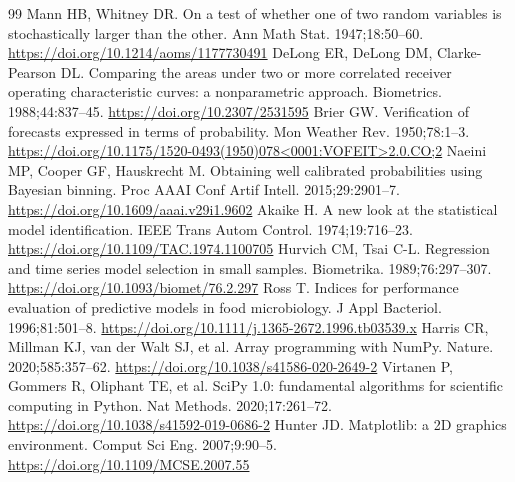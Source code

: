 {\begin{thebibliography}{99}
 Mann HB, Whitney DR. On a test of whether one of two random variables is stochastically larger than the other. Ann Math Stat. 1947;18:50--60. \url{https://doi.org/10.1214/aoms/1177730491}
 DeLong ER, DeLong DM, Clarke-Pearson DL. Comparing the areas under two or more correlated receiver operating characteristic curves: a nonparametric approach. Biometrics. 1988;44:837--45. \url{https://doi.org/10.2307/2531595}
 Brier GW. Verification of forecasts expressed in terms of probability. Mon Weather Rev. 1950;78:1--3. \url{https://doi.org/10.1175/1520-0493(1950)078<0001:VOFEIT>2.0.CO;2}
 Naeini MP, Cooper GF, Hauskrecht M. Obtaining well calibrated probabilities using Bayesian binning. Proc AAAI Conf Artif Intell. 2015;29:2901--7. \url{https://doi.org/10.1609/aaai.v29i1.9602}
 Akaike H. A new look at the statistical model identification. IEEE Trans Autom Control. 1974;19:716--23. \url{https://doi.org/10.1109/TAC.1974.1100705}
 Hurvich CM, Tsai C-L. Regression and time series model selection in small samples. Biometrika. 1989;76:297--307. \url{https://doi.org/10.1093/biomet/76.2.297}
 Ross T. Indices for performance evaluation of predictive models in food microbiology. J Appl Bacteriol. 1996;81:501--8. \url{https://doi.org/10.1111/j.1365-2672.1996.tb03539.x}
 Harris CR, Millman KJ, van der Walt SJ, et al. Array programming with NumPy. Nature. 2020;585:357--62. \url{https://doi.org/10.1038/s41586-020-2649-2}
 Virtanen P, Gommers R, Oliphant TE, et al. SciPy 1.0: fundamental algorithms for scientific computing in Python. Nat Methods. 2020;17:261--72. \url{https://doi.org/10.1038/s41592-019-0686-2}
 Hunter JD. Matplotlib: a 2D graphics environment. Comput Sci Eng. 2007;9:90--5. \url{https://doi.org/10.1109/MCSE.2007.55}
\end{thebibliography}
}
